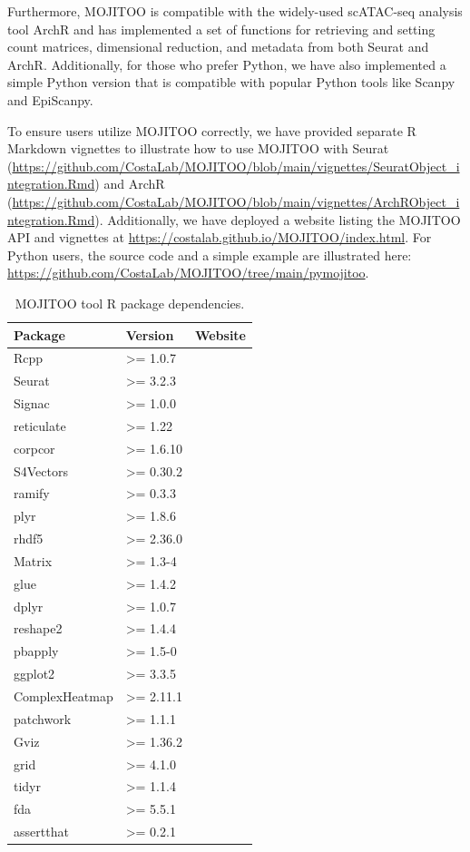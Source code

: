 Furthermore, MOJITOO is compatible with the widely-used scATAC-seq analysis tool ArchR and has implemented a set of functions for retrieving and setting count matrices, dimensional reduction, and metadata from both Seurat and ArchR. Additionally, for those who prefer Python, we have also implemented a simple Python version that is compatible with popular Python tools like Scanpy and EpiScanpy.

To ensure users utilize MOJITOO correctly, we have provided separate R Markdown vignettes to illustrate how to use MOJITOO with Seurat (\url{https://github.com/CostaLab/MOJITOO/blob/main/vignettes/SeuratObject_integration.Rmd}) and ArchR (\url{https://github.com/CostaLab/MOJITOO/blob/main/vignettes/ArchRObject_integration.Rmd}). Additionally, we have deployed a website listing the MOJITOO API and vignettes at \url{https://costalab.github.io/MOJITOO/index.html}. For Python users, the source code and a simple example are illustrated here: \url{https://github.com/CostaLab/MOJITOO/tree/main/pymojitoo}.
\begin{table}[!ht]
	\centering
	\begin{tabular}{lll}
		\toprule
		\textbf{Package} & \textbf{Version} & \textbf{Website} \\
		\midrule
		  Rcpp  & >= 1.0.7& \url{} \\
		  Seurat & >= 3.2.3 & \url{} \\
		  Signac & >= 1.0.0& \url{} \\
		  reticulate & >= 1.22& \url{} \\
		  corpcor & >= 1.6.10 & \url{} \\
		  S4Vectors & >= 0.30.2 & \url{} \\
		  ramify & >= 0.3.3 & \url{} \\
		  plyr & >= 1.8.6 & \url{} \\
		  rhdf5 & >= 2.36.0 & \url{} \\
		  Matrix & >= 1.3-4 & \url{} \\
		  glue & >= 1.4.2 & \url{} \\
		  dplyr & >= 1.0.7 & \url{} \\
		  reshape2 & >= 1.4.4 & \url{} \\
		  pbapply & >= 1.5-0 & \url{} \\
		  ggplot2 & >= 3.3.5 & \url{} \\
		  ComplexHeatmap & >= 2.11.1 & \url{} \\
		  patchwork & >= 1.1.1 & \url{} \\
		  Gviz & >= 1.36.2 & \url{} \\
		  grid & >= 4.1.0 & \url{} \\
		  tidyr & >= 1.1.4 & \url{} \\
		  fda & >= 5.5.1 & \url{} \\
		  assertthat & >= 0.2.1 & \url{} \\
		\bottomrule
	\end{tabular}
	\vspace{0.1cm}
	\caption[MOJITOO tool R package dependencies]{MOJITOO tool R package dependencies.}
	\label{tab:mojitoo_R_dependencies}
\end{table}

